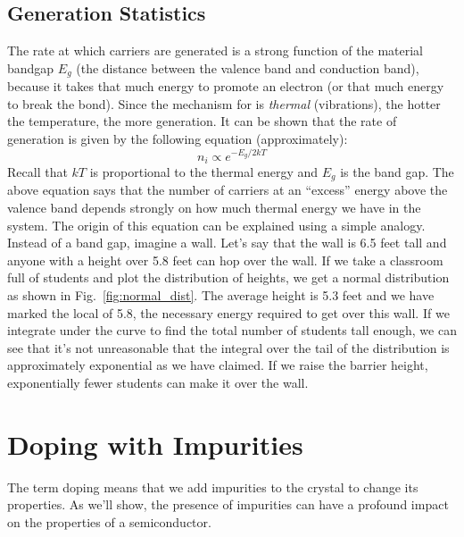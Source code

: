 \subsection{Generation Statistics}
 The rate at which carriers are generated is a strong function of the material bandgap $E_g$ (the distance between the valence band and conduction band), because it takes that much energy to promote an electron (or that much energy to break the bond).  Since the mechanism for is \textit{thermal} (vibrations), the hotter the temperature, the more generation.    It can be shown that the rate of generation is given by the following equation (approximately):
\begin{equation}
        n_i \propto e^{-E_g/2kT}
\end{equation}
Recall that $kT$ is proportional to the thermal energy and  $E_g$ is the band gap.  The above equation says that the number of carriers at an “excess” energy above the valence band depends strongly on how much thermal energy we have in the system.  The origin of this equation can be explained using a simple analogy.  Instead of a band gap, imagine a wall.  Let’s say that the wall is 6.5 feet tall and anyone with a height over 5.8 feet can hop over the wall.  If we take a classroom full of students and plot the distribution of heights, we get a normal distribution as shown in Fig.~\ref{fig:normal_dist}.  The average height is 5.3 feet and we have marked the local of 5.8, the necessary energy required to get over this wall.  If we integrate under the curve to find the total number of students tall enough, we can see that it’s not unreasonable that the integral over the tail of the distribution is approximately exponential as we have claimed.  If we raise the barrier height, exponentially fewer students can make it over the wall.
\section{Doping with Impurities}
The term doping means that we add impurities to the crystal to change its properties.  As we’ll show, the presence of impurities can have a profound impact on the properties of a semiconductor.

